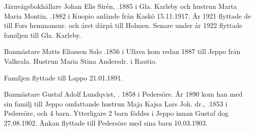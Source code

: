 Järnvägsbokhållare Johan Elis Sirén, .1885 i Gla. Karleby och hustrun Marta Maria Montin, .1882 i Kuopio anlände från Kaskö 15.11.1917. År 1921 flyttade de till Fors hemmansnr. och året därpå till Holmen. Senare under år 1922 flyttade familjen till Gla. Karleby.
\begin{jhchildren}
  \item {}
  \item {}
\end{jhchildren}


Banmästare Matts Eliasson Salo .1856 i Ullava kom redan 1887 till Jeppo från Valkeala. Hustrun Maria Stina Andersdr.  i Rautio.
\begin{jhchildren}
  \item {}
  \item {}
  \item {}
\end{jhchildren}
Familjen flyttade till Lappo 21.01.1891.


Banmästare Gustaf Adolf Lundqvist, . 1858 i Pedersöre. År 1890 kom han med sin familj till Jeppo omfattande hustrun Maja Kajsa Lars Joh. dr., .1853 i Pedersöre, och 4 barn. Ytterligare 2 barn föddes i Jeppo innan Gustaf dog 27.08.1902. Änkan flyttade till Pedersöre med sina barn 10.03.1903.
\begin{jhchildren}
  \item {}
  \item {}
  \item {}
  \item {}
  \item {}
  \item {}
\end{jhchildren}


